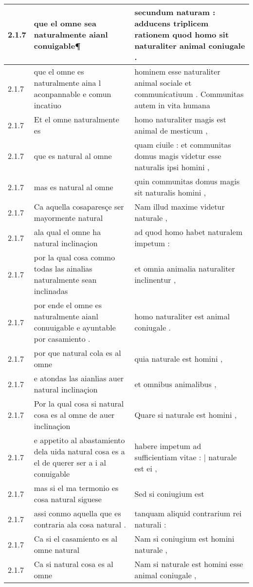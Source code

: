 \begin{tabular}{|p{1cm}|p{6.5cm}|p{6.5cm}|}
2.1.7 & que el omne sea naturalmente aianl conuigable¶ & secundum naturam : adducens triplicem rationem quod homo sit naturaliter animal coniugale . \\\hline
2.1.7 & que el omne es naturalmente aina l aconpannable e comun incatiuo & hominem esse naturaliter animal sociale et communicatiuum . Communitas autem in vita humana \\\hline
2.1.7 & Et el omne naturalmente es & homo naturaliter magis est animal de mesticum , \\\hline
2.1.7 & que es natural al omne & quam ciuile : et communitas domus magis videtur esse naturalis ipsi homini , \\\hline
2.1.7 & mas es natural al omne & quin communitas domus magis sit naturalis homini , \\\hline
2.1.7 & Ca aquella cosaparesçe ser mayormente natural & Nam illud maxime videtur naturale , \\\hline
2.1.7 & ala qual el omne ha natural inclinaçion & ad quod homo habet naturalem impetum : \\\hline
2.1.7 & por la qual cosa commo todas las ainalias naturalmente sean inclinadas & et omnia animalia naturaliter inclinentur , \\\hline
2.1.7 & por ende el omne es naturalmente aianl conuuigable e ayuntable por casamiento . & homo naturaliter est animal coniugale . \\\hline
2.1.7 & por que natural cola es al omne & quia naturale est homini , \\\hline
2.1.7 & e atondas las aianlias auer natural inclinaçion & et omnibus animalibus , \\\hline
2.1.7 & Por la qual cosa si natural cosa es al omne de auer inclinaçion & Quare si naturale est homini , \\\hline
2.1.7 & e appetito al abastamiento dela uida natural cosa es a el de querer ser a i al conuigable & habere impetum ad sufficientiam vitae : | naturale est ei , \\\hline
2.1.7 & mas si el ma termonio es cosa natural siguese & Sed si coniugium est \\\hline
2.1.7 & assi conmo aquella que es contraria ala cosa natural . & tanquam aliquid contrarium rei naturali : \\\hline
2.1.7 & Ca si el casamiento es al omne natural & Nam si coniugium est homini naturale , \\\hline
2.1.7 & Ca si natural cosa es al omne & Nam si naturale est homini esse animal coniugale , \\\hline

\end{tabular}
